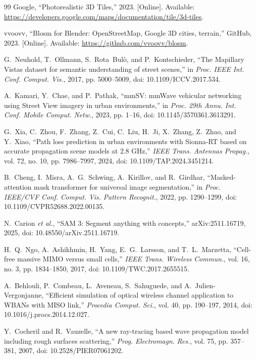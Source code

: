 \documentclass{IEEEoj}
\begin{document}
\begin{thebibliography}{99}
Google, ``Photorealistic 3D Tiles,'' 2023. [Online]. Available:
\url{https://developers.google.com/maps/documentation/tile/3d-tiles}.

vvoovv, ``Blosm for Blender: OpenStreetMap, Google 3D cities, terrain,''
GitHub, 2023. [Online]. Available: \url{https://github.com/vvoovv/blosm}.

G.~Neuhold, T.~Ollmann, S.~Rota~Bul\`o, and P.~Kontschieder,
``The Mapillary Vistas dataset for semantic understanding of street scenes,''
in \emph{Proc. IEEE Int. Conf. Comput. Vis.}, 2017, pp. 5000--5009,
doi: 10.1109/ICCV.2017.534.

A.~Kamari, Y.~Chae, and P.~Pathak, ``mmSV: mmWave vehicular networking using
Street View imagery in urban environments,'' in \emph{Proc. 29th Annu. Int.
Conf. Mobile Comput. Netw.}, 2023, pp. 1--16,
doi: 10.1145/3570361.3613291.

G.~Xia, C.~Zhou, F.~Zhang, Z.~Cui, C.~Liu, H.~Ji, X.~Zhang, Z.~Zhao, and
Y.~Xiao, ``Path loss prediction in urban environments with Sionna-RT based on
accurate propagation scene models at 2.8 GHz,'' \emph{IEEE Trans. Antennas
Propag.}, vol. 72, no. 10, pp. 7986--7997, 2024,
doi: 10.1109/TAP.2024.3451214.

B.~Cheng, I.~Misra, A.~G.~Schwing, A.~Kirillov, and R.~Girdhar,
``Masked-attention mask transformer for universal image segmentation,'' in
\emph{Proc. IEEE/CVF Conf. Comput. Vis. Pattern Recognit.}, 2022,
pp. 1290--1299, doi: 10.1109/CVPR52688.2022.00135.

N.~Carion \emph{et al.}, ``SAM 3: Segment anything with concepts,''
arXiv:2511.16719, 2025, doi: 10.48550/arXiv.2511.16719.

H.~Q.~Ngo, A.~Ashikhmin, H.~Yang, E.~G.~Larsson, and T.~L.~Marzetta,
``Cell-free massive MIMO versus small cells,'' \emph{IEEE Trans. Wireless
Commun.}, vol. 16, no. 3, pp. 1834--1850, 2017,
doi: 10.1109/TWC.2017.2655515.

A.~Behlouli, P.~Combeau, L.~Aveneau, S.~Sahuguede, and
A.~Julien-Vergonjanne, ``Efficient simulation of optical wireless channel
application to WBANs with MISO link,'' \emph{Procedia Comput. Sci.}, vol. 40,
pp. 190--197, 2014, doi: 10.1016/j.procs.2014.12.027.

Y.~Cocheril and R.~Vauzelle, ``A new ray-tracing based wave propagation model
including rough surfaces scattering,'' \emph{Prog. Electromagn. Res.}, vol. 75,
pp. 357--381, 2007, doi: 10.2528/PIER07061202.


\end{thebibliography}
\end{document}
